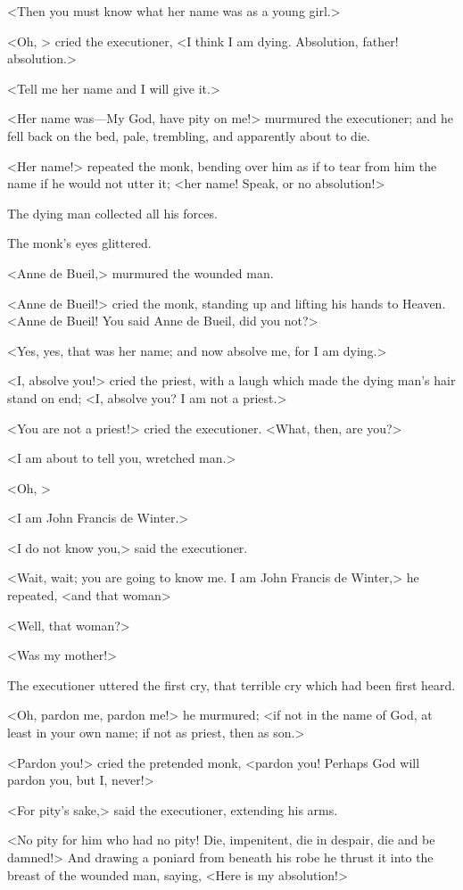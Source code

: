 <Then you must know what her name was as a young girl.>

<Oh, > cried the executioner, <I think I am dying. Absolution, father! absolution.>

<Tell me her name and I will give it.>

<Her name was—My God, have pity on me!> murmured the executioner; and he fell back on the bed, pale, trembling, and apparently about to die.

<Her name!> repeated the monk, bending over him as if to tear from him the name if he would not utter it; <her name! Speak, or no absolution!>

The dying man collected all his forces.

The monk's eyes glittered.

<Anne de Bueil,> murmured the wounded man.

<Anne de Bueil!> cried the monk, standing up and lifting his hands to Heaven. <Anne de Bueil! You said Anne de Bueil, did you not?>

<Yes, yes, that was her name; and now absolve me, for I am dying.>

<I, absolve you!> cried the priest, with a laugh which made the dying man's hair stand on end; <I, absolve you? I am not a priest.>

<You are not a priest!> cried the executioner. <What, then, are you?>

<I am about to tell you, wretched man.>

<Oh, >

<I am John Francis de Winter.>

<I do not know you,> said the executioner.

<Wait, wait; you are going to know me. I am John Francis de Winter,> he repeated, <and that woman\longdash>

<Well, that woman?>

<Was my mother!>

The executioner uttered the first cry, that terrible cry which had been first heard.

<Oh, pardon me, pardon me!> he murmured; <if not in the name of God, at least in your own name; if not as priest, then as son.>

<Pardon you!> cried the pretended monk, <pardon you! Perhaps God will pardon you, but I, never!>

<For pity's sake,> said the executioner, extending his arms.

<No pity for him who had no pity! Die, impenitent, die in despair, die and be damned!> And drawing a poniard from beneath his robe he thrust it into the breast of the wounded man, saying, <Here is my absolution!>


